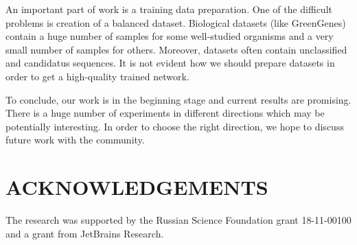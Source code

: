 \documentclass[a4paper,twoside]{article}
\begin{document}
An important part of work is a training data preparation.
One of the difficult problems is creation of a balanced dataset.
Biological datasets (like GreenGenes) contain a huge number of samples for some well-studied organisms and a very small number of samples for others.
Moreover, datasets often contain unclassified and candidatus sequences.
It is not evident how we should prepare datasets in order to get a high-quality trained network.

To conclude, our work is in the beginning stage and current results are promising. 
There is a huge number of experiments in different directions which may be potentially interesting.
In order to choose the right direction, we hope to discuss future work with the community.


\section*{\uppercase{Acknowledgements}}

\noindent The research was supported by the Russian Science Foundation grant 18-11-00100 and a grant from JetBrains Research.




{\small
}


\vfill
\end{document}
